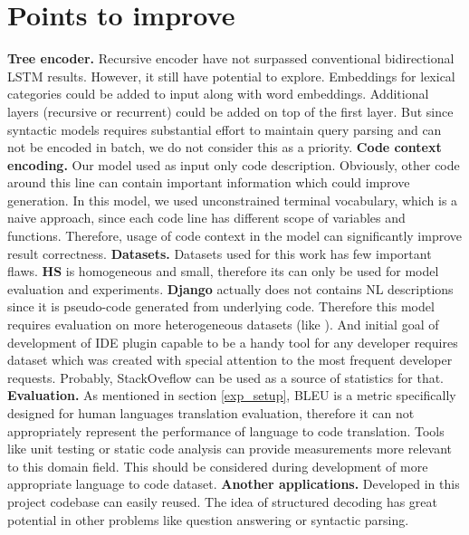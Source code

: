 \section{Points to improve}
\textbf{Tree encoder.} Recursive encoder have not surpassed conventional bidirectional LSTM results. However, it still have potential to explore. Embeddings for lexical categories could be added to input along with word embeddings. Additional layers (recursive or recurrent) could be added on top of the first layer. But since syntactic models requires substantial effort to maintain query parsing and can not be encoded in batch, we do not consider this as a priority.
\textbf{Code context encoding.} Our model used as input only code description. Obviously, other code around this line can contain important information which could improve generation. In this model, we used unconstrained terminal vocabulary, which is a  naive approach, since each code line has different scope of variables and functions. Therefore, usage of code context in the model can significantly improve result correctness.
\textbf{Datasets.} Datasets used for this work has few important flaws. \textbf{HS} is homogeneous and small, therefore its can only be used for model evaluation and experiments. \textbf{Django} actually does not contains NL descriptions since it is pseudo-code generated from underlying code. Therefore this model requires evaluation on more heterogeneous datasets (like \cite{Barone2017}). And initial goal of development of IDE plugin capable to be a handy tool for any developer requires dataset which was created with special attention to the most frequent developer requests. Probably, StackOveflow can be used as a source of statistics for that.
\textbf{Evaluation.} As mentioned in section \ref{exp_setup}, BLEU is a metric specifically designed for human languages translation evaluation, therefore it can not appropriately represent the performance of language to code translation. Tools like unit testing or static code analysis can provide measurements more relevant to this domain field. This should be considered during development of more appropriate language to code dataset.
\textbf{Another applications.} Developed in this project codebase can easily reused. The idea of structured decoding has great potential in other problems like question answering or syntactic parsing. 


